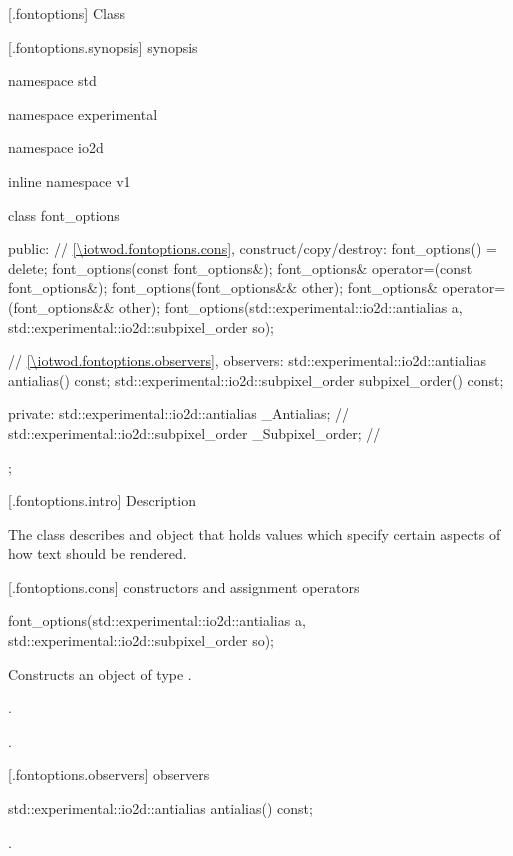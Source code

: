  [\iotwod.fontoptions] {Class }

 [\iotwod.fontoptions.synopsis] { synopsis}

\begin{codeblock}
namespace std { namespace experimental { namespace io2d { inline namespace v1 {
  class font_options {
    public:
    // \ref{\iotwod.fontoptions.cons}, construct/copy/destroy:
    font_options() = delete;
    font_options(const font_options&);
    font_options& operator=(const font_options&);
    font_options(font_options&& other);
    font_options& operator=(font_options&& other);
    font_options(std::experimental::io2d::antialias a,
      std::experimental::io2d::subpixel_order so);

    // \ref{\iotwod.fontoptions.observers}, observers:
    std::experimental::io2d::antialias antialias() const;
    std::experimental::io2d::subpixel_order subpixel_order() const;

  private:
    std::experimental::io2d::antialias _Antialias;           // \expos
    std::experimental::io2d::subpixel_order _Subpixel_order; // \expos
  };
} } } }
\end{codeblock}

 [\iotwod.fontoptions.intro] { Description}

\pnum
{}
The  class describes and object that holds values which specify certain aspects of how text should be rendered.

 [\iotwod.fontoptions.cons] { constructors and assignment operators}

\begin{itemdecl}
    font_options(std::experimental::io2d::antialias a,
      std::experimental::io2d::subpixel_order so);
\end{itemdecl}
\begin{itemdescr}
	\pnum
	\effects
	Constructs an object of type .
	
	\pnum
	\postconditions
	.
	
	.
	
\end{itemdescr}

 [\iotwod.fontoptions.observers] { observers}

\begin{itemdecl}
std::experimental::io2d::antialias antialias() const;
\end{itemdecl}
\begin{itemdescr}
	\pnum
	\returns
	.

\end{itemdescr}

